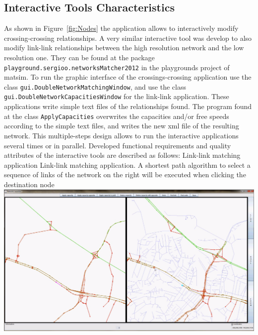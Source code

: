 \subsection{Interactive Tools Characteristics}
As shown in Figure~\ref{fig:Nodes} the application allows to interactively modify crossing-crossing relationships. A very similar interactive tool was develop to also modify link-link relationships between the high resolution network and the low resolution one. They can be found at the package \lstinline|playground.sergioo.networksMatcher2012| in the playgrounds project of \gls{matsim}. To run the graphic interface of the crossings-crossing application use the class \lstinline|gui.DoubleNetworkMatchingWindow|, and use the class \lstinline|gui.DoubleNetworkCapacitiesWindow| for the link-link application. These applications write simple text files of the relationships found. The program found at the class \lstinline|ApplyCapacities| overwrites the capacities and/or free speeds according to the simple text files, and writes the new \gls{xml} file of the resulting network. This multiple-steps design allows to run the interactive applications several times or in parallel. Developed functional requirements and quality attributes of the interactive tools are described as follows:
%
\createfigure
{Link-link matching application}
{Link-link matching application. A shortest path algorithm to select a sequence of links of the network on the right will be executed when clicking the destination node}
{\label{fig:Links}}
{\includegraphics[width=1.0\textwidth]{extending/figures/netEdSing/Links.png}}
{}

